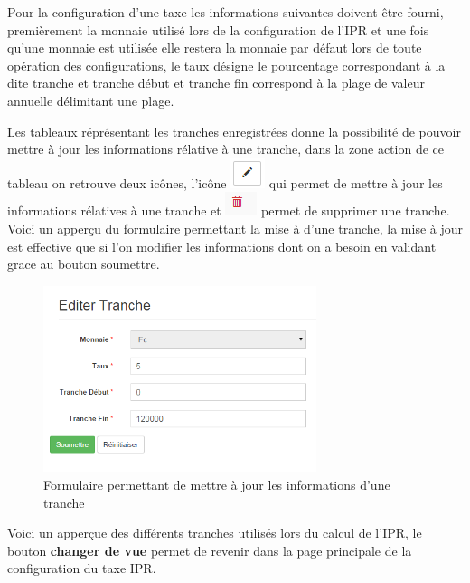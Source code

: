 \documentclass[12pt,a4paper]{report}
\begin{document}
Pour la configuration d'une taxe les informations suivantes doivent être fourni, premièrement la monnaie utilisé lors de la configuration de l'IPR et une fois qu'une monnaie est utilisée elle restera la monnaie par défaut lors de toute opération des configurations, le taux désigne le pourcentage correspondant à la dite tranche et tranche début et tranche fin correspond à la plage de valeur annuelle  délimitant une plage. 

Les tableaux réprésentant les tranches enregistrées donne la possibilité de pouvoir mettre à jour les informations rélative à une tranche, dans la zone action de ce tableau on retrouve deux icônes, l'icône \includegraphics[scale=0.7]{pic/EditBlack.png} qui permet de mettre à jour les informations rélatives à une tranche et \includegraphics[scale=0.7]{pic/DeleteWRed.png} permet de supprimer une tranche.
Voici un apperçu du formulaire permettant la mise à d'une tranche, la mise à jour est effective que si l'on modifier les informations dont on a besoin en validant grace au bouton soumettre. 

\begin{figure}[h]
\begin{center}
\includegraphics[width=8cm]{pic/EditTranche.png}
\end{center}
\caption{Formulaire permettant de mettre à jour les informations d'une tranche}
\label{Formulaire permettant de mettre à jour les informations d'une tranche}
\end{figure}

Voici un apperçue des différents tranches utilisés lors du calcul de l'IPR, le bouton \textbf{changer de vue} permet de revenir dans la page principale de la configuration du taxe IPR.
\end{document}
